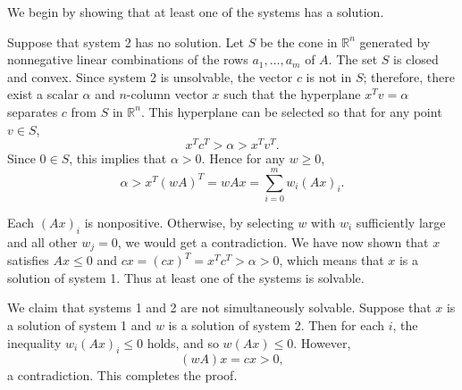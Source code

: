 \documentclass[12pt]{article}
\begin{document}
We begin by showing that at least one of the systems 
has a solution.  

Suppose that system 2
has no solution.  Let $S$ be the cone in $\mathbb{R}^n$ generated by nonnegative linear combinations of the rows $a_1,\dots, a_m$ of $A$.  The set $S$ is closed and convex.  Since system 2 is unsolvable, the vector $c$ is not in $S$; therefore, there exist a scalar $\alpha$ and $n$-column vector $x$ such that the hyperplane $x^T v=\alpha$ separates $c$ from $S$ in $\mathbb{R}^n$.  This hyperplane can be selected so that for any point $v\in S$,
\[
x^T c^T > \alpha > x^T v^T.
\]
Since $0\in S$, this implies that $\alpha>0$.  Hence for any $w\ge 0$,
\[
\alpha > x^T (wA)^T = wAx = \sum_{i=0}^m w_i (Ax)_i.
\]

Each $(Ax)_i$ is nonpositive.  Otherwise, by selecting $w$ with $w_i$ sufficiently large and all other $w_j=0$, we would get a contradiction.
We have now shown that $x$ satisfies
$Ax\leq 0$ and $cx =(cx)^T=x^T c^T > \alpha > 0$, which means that $x$ is a solution of system 1.  Thus at least one of the systems is solvable.

We claim that systems 1 and 2 are not simultaneously solvable.  Suppose
that $x$ is a solution of system 1 and $w$ is a solution of system 2.  Then
for each $i$, the inequality $w_i (Ax)_i\le 0$ holds, and so $w(Ax)\le 0$.
However,
\[
(wA)x=cx>0,
\]
a contradiction.  This completes the proof.
\end{document}
